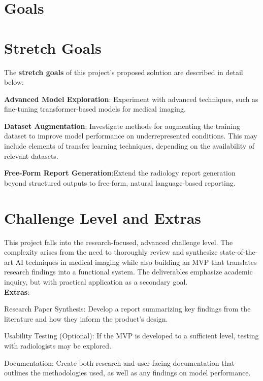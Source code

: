 \documentclass{article}
\begin{document}
\section{Goals}

\section{Stretch Goals}
The \textbf{stretch goals} of this project's proposed solution are described in detail below:

\begin{itemize}
\begin{item}
    \textbf{Advanced Model Exploration}: Experiment with advanced techniques, such as fine-tuning transformer-based models for medical imaging.
\end{item}
\begin{item} 
    \textbf{Dataset Augmentation}: Investigate methods for augmenting the training dataset to improve model performance on underrepresented conditions. This may include elements of transfer learning techniques, depending on the availability of relevant datasets.
\end{item}
\begin{item} 
    \textbf{Free-Form Report Generation}:Extend the radiology report generation beyond structured outputs to free-form, natural language-based reporting.
\end{item}
\end{itemize}

\section{Challenge Level and Extras}
This project falls into the research-focused, advanced challenge level. The complexity arises from the need to thoroughly review and synthesize state-of-the-art AI techniques in medical imaging while also building an MVP that translates research findings into a functional system. The deliverables emphasize academic inquiry, but with practical application as a secondary goal.\\

\textbf{Extras}:
\begin{itemize}
\begin{item}
    Research Paper Synthesis: Develop a report summarizing key findings from the literature and how they inform the product’s design.
\end{item}
\begin{item}
Usability Testing (Optional): If the MVP is developed to a sufficient level, testing with radiologists may be explored.
\end{item}
\begin{item}
Documentation: Create both research and user-facing documentation that outlines the methodologies used, as well as any findings on model performance.
\end{item}
\end{itemize}
\end{document}
